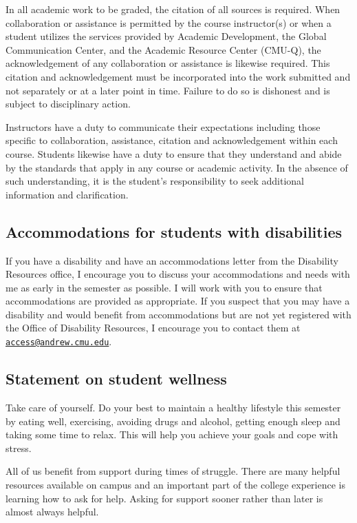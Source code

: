 \documentclass{article}
\begin{document}
In all academic work to be graded, the citation of all sources is required. When
collaboration or assistance is permitted by the course instructor(s) or when a
student utilizes the services provided by Academic Development, the Global
Communication Center, and the Academic Resource Center (CMU-Q), the
acknowledgement of any collaboration or assistance is likewise required. This
citation and acknowledgement must be incorporated into the work submitted and
not separately or at a later point in time. Failure to do so is dishonest and is
subject to disciplinary action.

Instructors have a duty to communicate their expectations including those
specific to collaboration, assistance, citation and acknowledgement within each
course. Students likewise have a duty to ensure that they understand and abide
by the standards that apply in any course or academic activity. In the absence
of such understanding, it is the student’s responsibility to seek additional
information and clarification.

\subsection*{Accommodations for students with disabilities}

If you have a disability and have an accommodations letter from the Disability
Resources office, I encourage you to discuss your accommodations and needs with
me as early in the semester as possible. I will work with you to ensure that
accommodations are provided as appropriate. If you suspect that you may have a
disability and would benefit from accommodations but are not yet registered with
the Office of Disability Resources, I encourage you to contact them at
\href{mailto:access@andrew.cmu.edu}{\texttt{access@andrew.cmu.edu}}.


\subsection*{Statement on student wellness}

Take care of yourself.  Do your best to maintain a healthy lifestyle this
semester by eating well, exercising, avoiding drugs and alcohol, getting enough
sleep and taking some time to relax. This will help you achieve your goals and
cope with stress.

All of us benefit from support during times of struggle. There are many helpful
resources available on campus and an important part of the college experience is
learning how to ask for help. Asking for support sooner rather than later is
almost always helpful.
\end{document}
